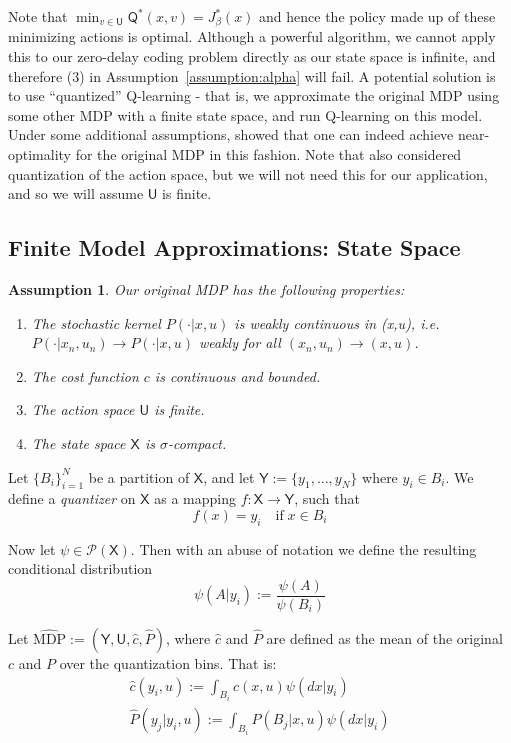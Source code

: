\documentclass[conference, draftcls, onecolumn]{IEEEtran}
\newtheorem{assumption}{Assumption}
\begin{document}
Note that \(\min_{v \in \mathsf{U}}\mathsf{Q}^*(x,v) = J^*_\beta(x)\) and hence the policy made up of these minimizing actions is optimal. Although a powerful algorithm, we cannot apply this to our zero-delay coding problem directly as our state space is infinite, and therefore (3) in Assumption~\ref{assumption:alpha} will fail. A potential solution is to use ``quantized'' Q-learning - that is, we approximate the original MDP using some other MDP with a finite state space, and run Q-learning on this model. Under some additional assumptions, \cite{Kara} showed that one can indeed achieve near-optimality for the original MDP in this fashion. Note that \cite{Kara} also considered quantization of the action space, but we will not need this for our application, and so we will assume \(\mathsf{U}\) is finite.

\subsection{Finite Model Approximations: State Space}
\begin{assumption}\label{assumption:MDP} Our original MDP has the following properties:
    \begin{enumerate}
        \item The stochastic kernel \(P(\cdot | x,u)\) is weakly continuous in (x,u), i.e. \(P(\cdot | x_n,u_n) \to P(\cdot | x,u)\) weakly for all \((x_n,u_n) \to (x,u)\).
        \item The cost function \(c\) is continuous and bounded.
        \item The action space \(\mathsf{U}\) is finite.
        \item The state space \(\mathsf{X}\) is \(\sigma\)-compact.
    \end{enumerate}
\end{assumption}

Let \(\{B_i\}_{i=1}^N\) be a partition of \(\mathsf{X}\), and let \(\mathsf{Y} := \{y_1,\ldots,y_N\}\) where \(y_i \in B_i\). We define a \emph{quantizer} on \(\mathsf{X}\) as a mapping \(f : \mathsf{X} \to \mathsf{Y}\), such that
\[ f(x) = y_i \quad \text{if} \; x \in B_i \]

Now let \(\psi \in \mathcal{P}(\mathsf{X})\). Then with an abuse of notation we define the resulting conditional distribution
\[\psi(A | y_i) := \frac{\psi(A)}{\psi(B_i)}\]

Let \(\hat{\text{MDP}} := (\mathsf{Y}, \mathsf{U}, \hat{c}, \hat{P})\), where \(\hat{c}\) and \(\hat{P}\) are defined as the mean of the original \(c\) and \(P\) over the quantization bins. That is:
\begin{gather} \nonumber \hat{c}(y_i,u) := \int_{B_i}c(x,u)\psi(dx | y_i) \\
    \hat{P}(y_j | y_i,u) := \int_{B_i}P(B_j | x,u)\psi(dx | y_i)\label{eq:hats}\end{gather}
\end{document}
